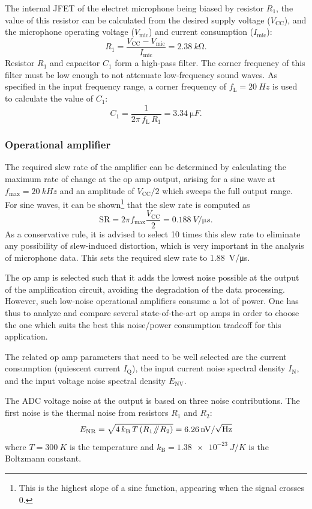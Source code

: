 \documentclass{EPL-master-thesis-covers-EN}
\newcommand{\parallelsum}{\mathbin{\!/\mkern-5mu/\!}}
\newcommand{\te}[1]{\textrm{#1}}
\begin{document}
The internal JFET of the electret microphone being biased by resistor $R_1$, the value of this resistor can be calculated from the desired supply voltage ($V_\te{CC}$), and the microphone operating voltage ($V_\te{mic}$) and current consumption ($I_\te{mic}$):
\[
 R_1 = \frac{V_\te{CC} - V_\te{mic}}{I_\te{mic}} = \SI{2.38}{k\ohm}.
\]
Resistor $R_1$ and capacitor $C_1$ form a high-pass filter. The corner frequency of this filter must be low enough to not attenuate low-frequency sound waves. As specified in the input frequency range, a corner frequency of $f_\te{L} = \SI{20}{Hz}$ is used to calculate the value of $C_1$:
\[
 C_1 = \frac{1}{2 \pi \, f_\te{L} \, R_1} = \SI{3.34}{\micro F}.
\]

\subsubsection*{Operational amplifier}

The required slew rate of the amplifier can be determined by calculating the maximum rate of change at the op amp output, arising  for a sine wave at $f_\te{max} = \SI{20}{kHz}$ and an amplitude of $V_\te{CC}/2$ which sweeps the full output range. For sine waves, it can be shown\footnote{This is the highest slope of a sine function, appearing when the signal crosses 0.} that the slew rate is computed as
\[
 \te{SR} = 2 \pi f_\te{max} \frac{V_\te{CC}}{2} = \SI{0.188}{V/\micro s}.
\]
As a conservative rule, it is advised to select 10 times this slew rate to eliminate any possibility of slew-induced distortion, which is very important in the analysis of microphone data. This sets the required slew rate to \SI{1.88}{V/\micro s}.

The op amp is selected such that it adds the lowest noise possible at the output of the amplification circuit, avoiding the degradation of the data processing. However, such low-noise operational amplifiers consume a lot of power. One has thus to analyze and compare several state-of-the-art op amps in order to choose the one which suits the best this noise/power consumption tradeoff for this application.

The related op amp parameters that need to be well selected are the current consumption (quiescent current $I_\te{Q}$), the input current noise spectral density $I_\te{N}$, and the input voltage noise spectral density $E_\te{NV}$.

The ADC voltage noise at the output is based on three noise contributions. The first noise is the thermal noise from resistors $R_1$ and $R_2$:
\[
 E_\te{NR} = \sqrt{4 \, k_\te{B} \, T \, (R_1 \parallelsum R_2)} = \SI{6.26}{nV/\sqrt{Hz}}
\]
where $T = \SI{300}{K}$ is the temperature and $k_\te{B} = \SI{1.38e-23}{J/K}$ is the Boltzmann constant.
\end{document}
